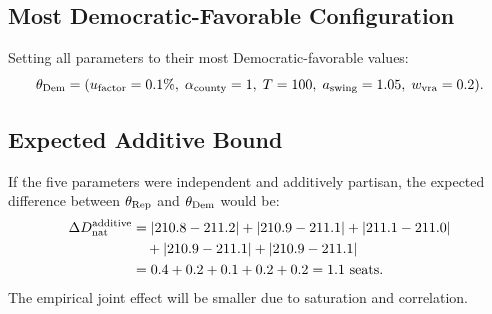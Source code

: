 \subsection{Most Democratic-Favorable Configuration}

Setting all parameters to their most Democratic-favorable values:
\[
  \theta_{\rm Dem} = (u_{\mathrm{factor}} = 0.1\%, \; \alpha_{\mathrm{county}} = 1, \; T = 100,
  \; a_{\mathrm{swing}} = 1.05, \; w_{\mathrm{vra}} = 0.2).
\]

\subsection{Expected Additive Bound}

If the five parameters were independent and additively partisan, the expected
difference between $\theta_{\rm Rep}$ and $\theta_{\rm Dem}$ would be:
\begin{align*}
  \Delta D_{\mathrm{nat}}^{\rm additive} &=
  |210.8 - 211.2| + |210.9 - 211.1| + |211.1 - 211.0| \\
  &\quad + |210.9 - 211.1| + |210.9 - 211.1| \\
  &= 0.4 + 0.2 + 0.1 + 0.2 + 0.2 = 1.1 \text{ seats}.
\end{align*}
The empirical joint effect will be smaller due to saturation and correlation.
